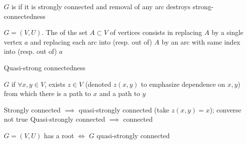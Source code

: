 \documentclass[aspectratio=43]{beamer}
\begin{document}
\begin{frame}
	\begin{definition}
	$G$ is  if it is strongly connected and removal of any arc destroys strong-connectedness
	\end{definition}
	\vfill
	\begin{definition}[Contraction]
	$G=(V,U)$. The  of the set $A\subset V$ of vertices consists in replacing $A$ by a single vertex $a$ and replacing each arc into (resp. out of) $A$ by an arc with same index into (resp. out of) $a$
	\end{definition}
\end{frame}
	
		
\begin{frame}{Quasi-strong connectedness}
	\begin{definition}
	$G$  if $\forall x,y\in V$, exists $z\in V$ (denoted $z(x,y)$ to emphasize dependence on $x,y$) from which there is a path to $x$ and a path to $y$
	\end{definition}
	\vfill
	Strongly connected $\implies$ quasi-strongly connected (take $z(x,y)=x$); converse not true
	\vfill
	Quasi-strongly connected $\implies$ connected
	\vfill
	\begin{lemma}
	$G=(V,U)$ has a root $\iff$ $G$ quasi-strongly connected
	\end{lemma}
\end{frame}
\end{document}
